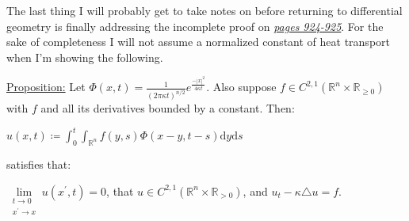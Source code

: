 \documentclass{book}
\newcommand{\inLinkRap}[2]{{\color{blue}\hyperlink{#1}{\textit{#2}}}}
\newcommand{\exTwo}{%
   \color{Purple}%
   \fontsize{13}{15}\selectfont%
}
\newcommand{\df}{\mathrm{d}}
\newcommand{\retTwo}{\hfill\bigbreak}
\begin{document}

The last thing I will probably get to take notes on before returning to differential geometry is finally addressing the incomplete proof \hypertarget{idk reference 3}{on} \inLinkRap{incomplete proof page 925}{pages 924-925}. For the sake of completeness I will not assume a normalized constant of heat transport when I'm showing the following.\retTwo


\exTwo\ul{Proposition:} Let $\Phi(x, t) = \frac{1}{(2\pi \kappa t)^{n/2}} e^{\frac{-|x|^2}{4\kappa t}}$. Also suppose $f \in C^{2,1}(\mathbb{R}^n \times \mathbb{R}_{\geq 0})$ with $f$ and all its derivatives bounded by a constant. Then:

{\centering$u(x, t) \coloneqq \int_0^t \int_{\mathbb{R}^n} f(y, s)\Phi(x - y, t - s)\df y\df s$\\ [4pt]\par}

satisfies that:

{\centering$\lim\limits_{\substack{t \to 0 \\ x^\prime \to x}}u(x^\prime, t) = 0$, that $u \in C^{2,1}(\mathbb{R}^n \times \mathbb{R}_{>0})$, and $u_t - \kappa \triangle u = f$.\retTwo\par}
\end{document}
